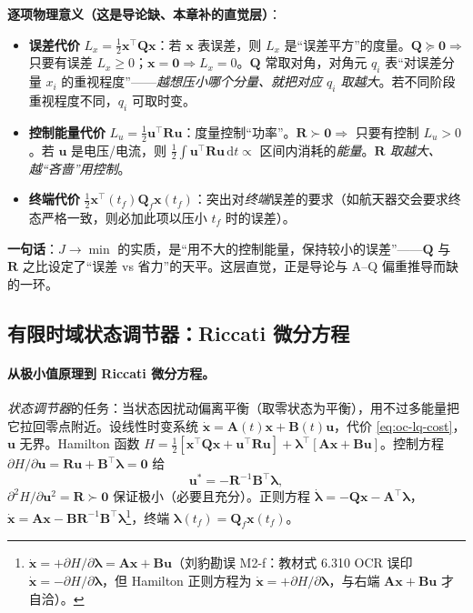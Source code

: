\begin{insight}
\textbf{逐项物理意义（这是导论缺、本章补的直觉层）}\cite{liubao2006modern}：
\begin{itemize}
  \item \textbf{误差代价} $L_x=\tfrac12\mathbf x^\top\mathbf Q\mathbf x$：若 $\mathbf x$ 表误差，则 $L_x$ 是“误差平方”的度量。$\mathbf Q\succeq\mathbf0\Rightarrow$ 只要有误差 $L_x\ge0$；$\mathbf x=\mathbf0\Rightarrow L_x=0$。$\mathbf Q$ 常取对角，对角元 $q_i$ 表“对误差分量 $x_i$ 的重视程度”——\emph{越想压小哪个分量、就把对应 $q_i$ 取越大}。若不同阶段重视程度不同，$q_i$ 可取时变。
  \item \textbf{控制能量代价} $L_u=\tfrac12\mathbf u^\top\mathbf R\mathbf u$：度量控制“功率”。$\mathbf R\succ\mathbf0\Rightarrow$ 只要有控制 $L_u>0$。若 $\mathbf u$ 是电压/电流，则 $\tfrac12\int\mathbf u^\top\mathbf R\mathbf u\,\mathrm dt\propto$ 区间内消耗的\emph{能量}。\emph{$\mathbf R$ 取越大、越“吝啬”用控制}。
  \item \textbf{终端代价} $\tfrac12\mathbf x^\top(t_f)\mathbf Q_f\mathbf x(t_f)$：突出对\emph{终端}误差的要求（如航天器交会要求终态严格一致，则必加此项以压小 $t_f$ 时的误差）。
\end{itemize}
\textbf{一句话}：$J\to\min$ 的实质，是“用不大的控制能量，保持较小的误差”——$\mathbf Q$ 与 $\mathbf R$ 之比设定了“误差 vs 省力”的天平。这层直觉，正是导论与 A--Q 偏重推导而缺的一环。
\end{insight}

\subsection{有限时域状态调节器：Riccati 微分方程}
\label{sec:oc-state-regulator}

\paragraph{从极小值原理到 Riccati 微分方程。}
\emph{状态调节器}的任务：当状态因扰动偏离平衡（取零状态为平衡），用不过多能量把它拉回零点附近。设线性时变系统 $\dot{\mathbf x}=\mathbf A(t)\mathbf x+\mathbf B(t)\mathbf u$，代价 \cref{eq:oc-lq-cost}，$\mathbf u$ 无界。Hamilton 函数 $H=\tfrac12[\mathbf x^\top\mathbf Q\mathbf x+\mathbf u^\top\mathbf R\mathbf u]+\boldsymbol\lambda^\top[\mathbf A\mathbf x+\mathbf B\mathbf u]$。控制方程 $\partial H/\partial\mathbf u=\mathbf R\mathbf u+\mathbf B^\top\boldsymbol\lambda=\mathbf0$ 给
\begin{equation}
  \mathbf u^*=-\mathbf R^{-1}\mathbf B^\top\boldsymbol\lambda,
  \label{eq:oc-lqr-u-costate}
\end{equation}
$\partial^2H/\partial\mathbf u^2=\mathbf R\succ\mathbf0$ 保证极小（必要且充分）。正则方程 $\dot{\boldsymbol\lambda}=-\mathbf Q\mathbf x-\mathbf A^\top\boldsymbol\lambda$，$\dot{\mathbf x}=\mathbf A\mathbf x-\mathbf B\mathbf R^{-1}\mathbf B^\top\boldsymbol\lambda$\footnote{$\dot{\mathbf x}=+\partial H/\partial\boldsymbol\lambda=\mathbf A\mathbf x+\mathbf B\mathbf u$（刘豹勘误 M2-f：教材式 6.310 OCR 误印 $\dot{\mathbf x}=-\partial H/\partial\boldsymbol\lambda$，但 Hamilton 正则方程为 $\dot{\mathbf x}=+\partial H/\partial\boldsymbol\lambda$，与右端 $\mathbf A\mathbf x+\mathbf B\mathbf u$ 才自洽）。}，终端 $\boldsymbol\lambda(t_f)=\mathbf Q_f\mathbf x(t_f)$。

